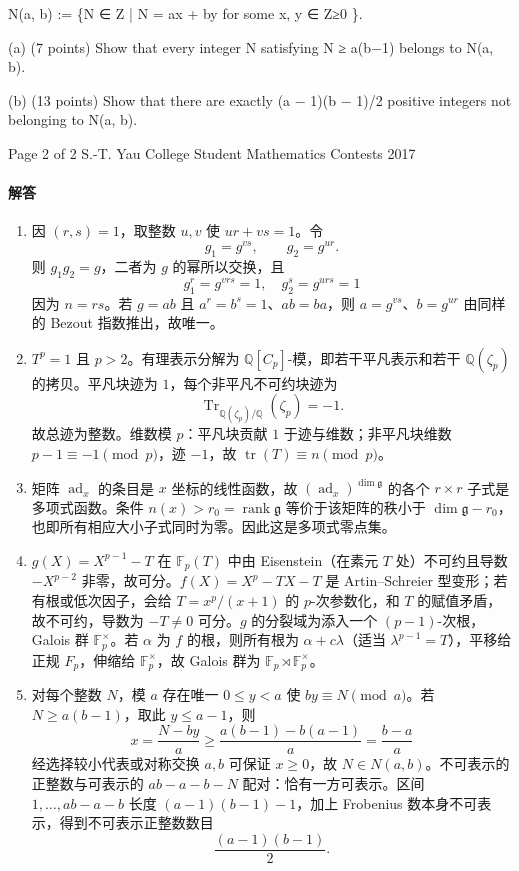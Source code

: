 \documentclass[UTF8,12pt]{ctexart}
\begin{document}
N(a, b) := \{N ∈ Z | N = ax + by for some x, y ∈ Z≥0 \}.

(a) (7 points) Show that every integer N satisfying N ≥ a(b−1) belongs to N(a, b).

(b) (13 points) Show that there are exactly (a − 1)(b − 1)/2 positive integers not belonging to N(a, b).

Page 2 of 2 S.-T. Yau College Student Mathematics Contests 2017

\paragraph{解答}
\begin{enumerate}[label=\textbf{\arabic*.},leftmargin=2.2em]
\item 因 \((r,s)=1\)，取整数 \(u,v\) 使 \(ur+vs=1\)。令
\[
g_1=g^{vs},\qquad g_2=g^{ur}.
\]
则 \(g_1g_2=g\)，二者为 \(g\) 的幂所以交换，且
\[
g_1^r=g^{vrs}=1,\quad g_2^s=g^{urs}=1
\]
因为 \(n=rs\)。若 \(g=ab\) 且 \(a^r=b^s=1\)、\(ab=ba\)，则 \(a=g^{vs}\)、\(b=g^{ur}\) 由同样的 Bezout 指数推出，故唯一。
\item \(T^p=1\) 且 \(p>2\)。有理表示分解为 \(\mathbb Q[C_p]\)-模，即若干平凡表示和若干 \(\mathbb Q(\zeta_p)\) 的拷贝。平凡块迹为 \(1\)，每个非平凡不可约块迹为
\[
\operatorname{Tr}_{\mathbb Q(\zeta_p)/\mathbb Q}(\zeta_p)=-1.
\]
故总迹为整数。维数模 \(p\)：平凡块贡献 \(1\) 于迹与维数；非平凡块维数 \(p-1\equiv-1\pmod p\)，迹 \(-1\)，故 \(\operatorname{tr}(T)\equiv n\pmod p\)。
\item 矩阵 \(\operatorname{ad}_x\) 的条目是 \(x\) 坐标的线性函数，故 \((\operatorname{ad}_x)^{\dim\mathfrak g}\) 的各个 \(r\times r\) 子式是多项式函数。条件 \(n(x)>r_0=\operatorname{rank}\mathfrak g\) 等价于该矩阵的秩小于 \(\dim\mathfrak g-r_0\)，也即所有相应大小子式同时为零。因此这是多项式零点集。
\item \(g(X)=X^{p-1}-T\) 在 \(\mathbb F_p(T)\) 中由 Eisenstein（在素元 \(T\) 处）不可约且导数 \(-X^{p-2}\) 非零，故可分。\(f(X)=X^p-TX-T\) 是 Artin--Schreier 型变形；若有根或低次因子，会给 \(T=x^p/(x+1)\) 的 \(p\)-次参数化，和 \(T\) 的赋值矛盾，故不可约，导数为 \(-T\ne0\) 可分。\(g\) 的分裂域为添入一个 \((p-1)\)-次根，Galois 群 \(\mathbb F_p^\times\)。若 \(\alpha\) 为 \(f\) 的根，则所有根为 \(\alpha+c\lambda\)（适当 \(\lambda^{p-1}=T\)），平移给正规 \(F_p\)，伸缩给 \(\mathbb F_p^\times\)，故 Galois 群为 \(\mathbb F_p\rtimes\mathbb F_p^\times\)。
\item 对每个整数 \(N\)，模 \(a\) 存在唯一 \(0\le y<a\) 使 \(by\equiv N\pmod a\)。若 \(N\ge a(b-1)\)，取此 \(y\le a-1\)，则
\[
x=\frac{N-by}{a}\ge \frac{a(b-1)-b(a-1)}a=\frac{b-a}{a}
\]
经选择较小代表或对称交换 \(a,b\) 可保证 \(x\ge0\)，故 \(N\in N(a,b)\)。不可表示的正整数与可表示的 \(ab-a-b-N\) 配对：恰有一方可表示。区间 \(1,\ldots,ab-a-b\) 长度 \((a-1)(b-1)-1\)，加上 Frobenius 数本身不可表示，得到不可表示正整数数目
\[
\frac{(a-1)(b-1)}2.
\]
\end{enumerate}
\end{document}
